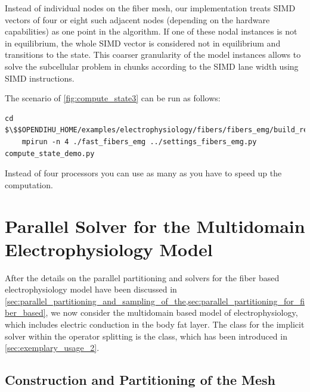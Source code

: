 Instead of individual nodes on the fiber mesh, our implementation treats SIMD vectors of four or eight such adjacent nodes (depending on the hardware capabilities) as one point in the algorithm.  If one of these nodal instances is not in equilibrium, the whole SIMD vector is considered not in equilibrium and transitions to the  state. This coarser granularity of the model instances allows to solve the subcellular problem in chunks according to the SIMD lane width using SIMD instructions.

\begin{reproduce_no_break}
  The scenario of \cref{fig:compute_state3} can be run as follows:
  \begin{lstlisting}[columns=fullflexible,breaklines=true,postbreak=\mbox{\textcolor{gray}{$\hookrightarrow$}\space}]
    cd $\$$OPENDIHU_HOME/examples/electrophysiology/fibers/fibers_emg/build_release
    mpirun -n 4 ./fast_fibers_emg ../settings_fibers_emg.py compute_state_demo.py
  \end{lstlisting}
  Instead of four processors you can use as many as you have to speed up the computation.
\end{reproduce_no_break}
\section{Parallel Solver for the Multidomain Electrophysiology Model}\label{sec:parallel_solver_multidomain}

After the details on the parallel partitioning and solvers for the fiber based electrophysiology model have been discussed in \cref{sec:parallel_partitioning_and_sampling_of_the,sec:parallel_partitioning_for_fiber_based}, we now consider the multidomain based model of electrophysiology, which includes electric conduction in the body fat layer. The class for the implicit solver within the operator splitting is the  class, which has been introduced in \cref{sec:exemplary_usage_2}.

\subsection{Construction and Partitioning of the Mesh}


